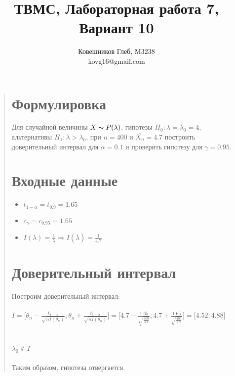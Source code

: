 \documentclass{article}
\begin{document}
\title{ТВМС, Лабораторная работа 7, Вариант 10}
\author{
	Ковешников Глеб, M3238\\
	kovg16@gmail.com
}
\maketitle

\begin{quote}
\section{Формулировка}
	\large Для случайной величины $X \thicksim P(\lambda)$, гипотезы $H_0:\lambda = \lambda_0 = 4$, альтернативы $H_1:\lambda > \lambda_0$, при $n = 400$ и $\overline{X_n} = 4.7$ построить доверительный интервал для $\alpha = 0.1$ и проверить гипотезу для $\gamma = 0.95$.
\section{Входные данные}
	\Large
        \begin{itemize}
		\item $t_{1 - \alpha} = t_{0.9} = 1.65$
		\item $c_{\gamma} = c_{0.95} = 1.65$
		\item $I(\lambda) = \frac{1}{\lambda} \Rightarrow I(\overline{\lambda}) = \frac{1}{4.7}$
        \end{itemize}
	\large
\section{Доверительный интервал}	
        Построим доверительный интервал: \\ \\
	\Large
	$I = \Biggl[\overline{\theta_n} - \frac{t_{1 - \alpha}}{\sqrt{nI(\theta_n)}} ; \overline{\theta_n} + \frac{t_{1 - \alpha}}{\sqrt{nI(\theta_n)}}\Biggr] = \Biggl[4.7 - \frac{1.65}{\sqrt{\frac{400}{4.7}}} ; 4.7 + \frac{1.65}{\sqrt{\frac{400}{4.7}}}\Biggr] = \bigl[4.52 ; 4.88\bigr]$ \\ \\ \\
	$\lambda_0 \notin I$ \\ \\
	\large
	Таким образом, гипотеза отвергается.

\end{quote}
\end{document}
